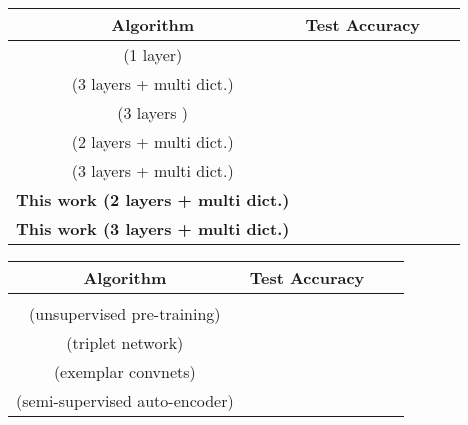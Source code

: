\documentclass{article} \usepackage{iclr2016_workshop,times}
\begin{document}
\begin{table*}[t!]

\caption{Classification accuracy on STL-10.}
\label{stl-results}
\begin{subtable}{\linewidth}
 \centering
 \caption{Algorithms that learn the filters unsupervised.}
\begin{tabular}{cccc}
\multicolumn{1}{c}{\bf Algorithm} &\multicolumn{1}{c}{\bf Test Accuracy}
\\ \hline
\cite{coates2011importance} (1 layer)                                                       & \\        
\cite{coates2011selecting}   (3 layers + multi dict.)                                    &\\         
 \cite{hui2013direct}   (3 layers )                                                                & \\         
\cite{bo2013unsupervised}  (2 layers + multi dict.)                                    & \\         
\cite{lin2014stable}  (3 layers + multi dict.)                                                &  \\        


 \hline
\textbf{This work (2 layers + multi dict.)}                                                                 & \\       
\textbf{This work (3 layers + multi dict.)}                                                                 & \\       
 \hline


\end{tabular}

\end{subtable}

\vspace{4mm}

 \begin{subtable}{\linewidth}
 \centering
 \caption{Supervised and semi-supervised algorithms.}
\begin{tabular}{cccc}
\multicolumn{1}{c}{\bf Algorithm} &\multicolumn{1}{c}{\bf Test Accuracy}\\ \hline

 \cite{swersky2013multi}                                                                             &\\
  \cite{paine2014analysis}(unsupervised pre-training)                                &\\
 \cite{hoffer2014deep} (triplet network)                                                       & \\
 \cite{dosovitskiy2014discriminative} (exemplar convnets)                         & \\
  \cite{zhao2015stacked} (semi-supervised auto-encoder)                         & \\
   \hline

\end{tabular}
\end{subtable}
\end{table*}
\end{document}
